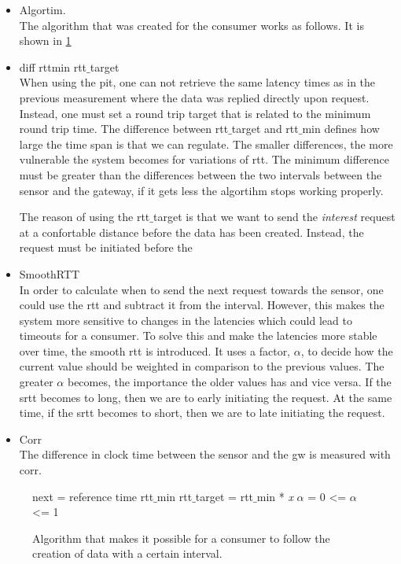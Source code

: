 \begin{itemize}
\item Algortim. \\
The algorithm that was created for the consumer works as follows. 
It is shown in \ref{fig:onetime}
\item diff rttmin rtt$\_$target\\
	When using the pit, one can not retrieve the same latency times as in the previous measurement where the data was replied directly upon request. Instead, one must set a round trip target that is related to the minimum round trip time. The difference between rtt$\_$target and rtt$\_$min defines how large the time span is that we can regulate. The smaller differences, the more vulnerable the system becomes for variations of rtt. The minimum difference must be greater than the differences between the two intervals between the sensor and the gateway, if it gets less the algortihm stops working properly.

	The reason of using the rtt$\_$target is that we want to send the \textit{interest} request at a confortable distance before the data has been created.
	Instead, the request must be initiated before the 

\item SmoothRTT \\
	In order to calculate when to send the next request towards the sensor, one could use the rtt and subtract it from the interval. 
	However, this makes the system more sensitive to changes in the latencies which could lead to timeouts for a consumer. To solve this and make the latencies more stable over time, the smooth rtt is introduced. It uses a factor, $\alpha$, to decide how the current value should be weighted in comparison to the previous values. The greater $\alpha$ becomes, the importance the older values has and vice versa.
	If the srtt becomes to long, then we are to early initiating the request. At the same time, if the srtt becomes to short, then we are to late initiating the request.

\item Corr \\
	The difference in clock time between the sensor and the gw is measured with corr.
\end{itemize}

   
\begin{figure}
\begin{algorithm}[H]
 next = reference time\;
 rtt$\_$min\;
 rtt$\_$target = rtt$\_$min * \textit{x}\;
 $\alpha$ = 0 <= $\alpha$ <= 1\;

\end{algorithm}
\caption{Algorithm that makes it possible for a consumer to follow the creation of data with a certain interval.}
    \label{fig:onetime}
\end{figure}


